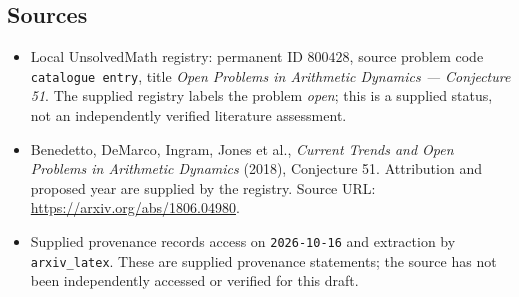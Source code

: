 \documentclass[11pt]{article}
\begin{document}
\subsection{Sources}
\begin{itemize}
\item Local UnsolvedMath registry: permanent ID \(800428\), source problem code \texttt{catalogue entry}, title \emph{Open Problems in Arithmetic Dynamics --- Conjecture 51}. The supplied registry labels the problem \emph{open}; this is a supplied status, not an independently verified literature assessment.
\item Benedetto, DeMarco, Ingram, Jones et al., \emph{Current Trends and Open Problems in Arithmetic Dynamics} (2018), Conjecture 51. Attribution and proposed year are supplied by the registry. Source URL: \url{https://arxiv.org/abs/1806.04980}.
\item Supplied provenance records access on \texttt{2026-10-16} and extraction by \texttt{arxiv\_latex}. These are supplied provenance statements; the source has not been independently accessed or verified for this draft.
\end{itemize}
\end{document}
